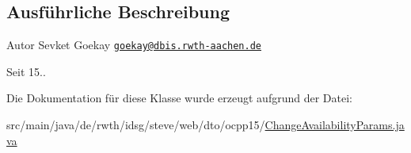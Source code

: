 \subsection{Ausführliche Beschreibung}
\begin{DoxyAuthor}{Autor}
Sevket Goekay \href{mailto:goekay@dbis.rwth-aachen.de}{\tt goekay@dbis.\+rwth-\/aachen.\+de} 
\end{DoxyAuthor}
\begin{DoxySince}{Seit}
15.. 
\end{DoxySince}


Die Dokumentation für diese Klasse wurde erzeugt aufgrund der Datei\+:\begin{DoxyCompactItemize}
\item 
src/main/java/de/rwth/idsg/steve/web/dto/ocpp15/\hyperlink{ocpp15_2_change_availability_params_8java}{Change\+Availability\+Params.\+java}\end{DoxyCompactItemize}
